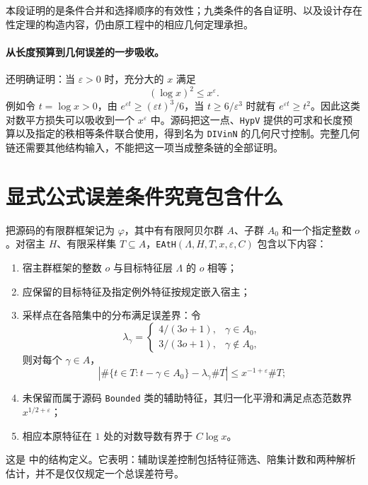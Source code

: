 \documentclass[UTF8,fontset=fandol,a4paper,openany,oneside]{ctexbook}
\theoremstyle{definition}
\theoremstyle{remark}
\begin{document}
本段证明的是条件合并和选择顺序的有效性；九类条件的各自证明、以及设计存在性定理的构造内容，仍由原工程中的相应几何定理承担。

\paragraph{从长度预算到几何误差的一步吸收。}
 还明确证明：当 $\varepsilon>0$ 时，充分大的 $x$ 满足
\[
(\log x)^2\le x^\varepsilon.
\]
例如令 $t=\log x>0$，由 $e^{\varepsilon t}\ge(\varepsilon t)^3/6$，当 $t\ge6/\varepsilon^3$ 时就有 $e^{\varepsilon t}\ge t^2$。因此这类对数平方损失可以吸收到一个 $x^\varepsilon$ 中。源码把这一点、\texttt{HypV} 提供的可求和长度预算以及指定的秩相等条件联合使用，得到名为 \texttt{DIVinN} 的几何尺寸控制。完整几何链还需要其他结构输入，不能把这一项当成整条链的全部证明。

\section{显式公式误差条件究竟包含什么}
\label{sec:arith-eath}
把源码的有限群框架记为 $\varphi$，其中有有限阿贝尔群 $A$、子群 $A_0$ 和一个指定整数 $o$。对宿主 $H$、有限采样集 $T\subseteq A$，\texttt{EAtH}$(\Lambda,H,T,x,\varepsilon,C)$ 包含以下内容：
\begin{enumerate}
\item 宿主群框架的整数 $o$ 与目标特征层 $\Lambda$ 的 $o$ 相等；
\item 应保留的目标特征及指定例外特征按规定嵌入宿主；
\item 采样点在各陪集中的分布满足误差界：令
\[
\lambda_\gamma=
\begin{cases}
4/(3o+1),&\gamma\in A_0,\\
3/(3o+1),&\gamma\notin A_0,
\end{cases}
\]
则对每个 $\gamma\in A$，
\begin{equation}
\left|\#\{t\in T:t-\gamma\in A_0\}-\lambda_\gamma\#T\right|
\le x^{-1+\varepsilon}\#T;
\label{eq:arith-shares}
\end{equation}
\item 未保留而属于源码 \texttt{Bounded} 类的辅助特征，其归一化平滑和满足点态范数界 $x^{1/2+\varepsilon}$；
\item 相应本原特征在 $1$ 处的对数导数有界于 $C\log x$。
\end{enumerate}
这是  中的结构定义。它表明：辅助误差控制包括特征筛选、陪集计数和两种解析估计，并不是仅仅规定一个总误差符号。
\end{document}

